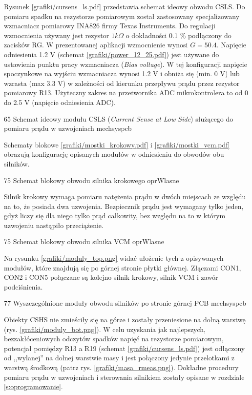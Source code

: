 Rysunek \ref{grafiki/cursens_ls.pdf} przedstawia schemat ideowy obwodu CSLS. Do pomiaru spadku na rezystorze pomiarowym został zastosowany specjalizowany wzmacniacz pomiarowy INA826 firmy Texas Instruments. Do regulacji wzmocnienia używany jest rezystor $ 1 k\Omega $ o dokładności 0.1 \% podłączony do zacisków RG. W prezentowanej aplikacji wzmocnienie wynosi $ G = 50.4 $. Napięcie odniesienia 1.2 V (schemat \ref{grafiki/power_12_25.pdf}) jest używane do ustawienia punktu pracy wzmacniacza ({\it Bias voltage}). W tej konfiguracji napięcie spoczynkowe na wyjściu wzmacniacza wynosi 1.2 V i obniża się (min. 0 V) lub wzrasta (max 3.3 V) w zależności od kierunku przepływu prądu przez rezystor pomiarowy R13. Użyteczny zakres na przetwornika ADC mikrokontrolera to od 0 do 2.5 V (napięcie odniesienia ADC).

	{65}
	{Schemat ideowy modułu CSLS ({\it Current Sense at Low Side}) służącego do pomiaru prądu w uzwojeniach}
	{mechsyspcb}
	
Schematy blokowe \ref{grafiki/mostki_krokowy.pdf} i \ref{grafiki/mostki_vcm.pdf} obrazują konfigurację opisanych modułów w odniesieniu do obwodów obu silników.

	{75}
	{Schemat blokowy obwodu silnika krokowego}
	{oprWlasne}
	
Silnik krokowy wymaga pomiaru natężenia prądu w dwóch miejscach ze względu na to, że posiada dwa uzwojenia. Bezpiecznik prądu jest wymagany tylko jeden, gdyż liczy się dla niego tylko prąd całkowity, bez względu na to w którym uzwojeniu nastąpiło przeciążenie. 

	{75}
	{Schemat blokowy obwodu silnika VCM}
	{oprWlasne}

Na rysunku \ref{grafiki/moduly_top.png} widać ułożenie tych z opisywanych modułów, które znajdują się po górnej stronie płytki głównej. Złączami CON1, CON2 i CON5 połączane są kolejno silnik krokowy, silnik VCM i zawór podciśnienia.
	
	{77}
	{Wyszczególnione moduły obwodu silników po stronie górnej PCB}
	{mechsyspcb}
	
Obiekty CSHS nie zmieściły się na górze i zostały przeniesione na dolną warstwę (rys. \ref{grafiki/moduly_bot.png}). W celu uzyskania jak najlepszych, bezzakłóceniowych odczytów spadków napięć na rezystorze pomiarowym, potencjał pomiędzy R13 a R19 (schemat \ref{grafiki/cursens_ls.pdf}) jest odłączony od ,,wylanej'' na dolnej warstwie masy i jest połączony jedynie przelotkami z warstwą środkową (patrz rys. \ref{grafiki/masa_rmeas.png}). Dokładne procedury pomiaru prądu w uzwojeniach i sterowania silnikiem zostały opisane w rozdziale \ref{s:oprogramowanie}. 

